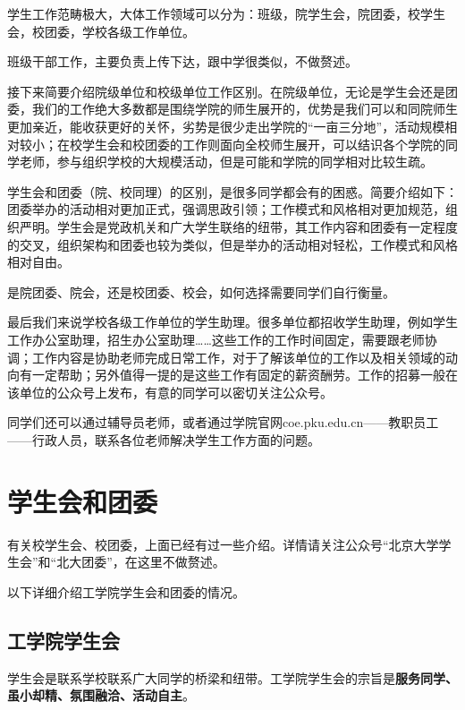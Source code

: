 \documentclass[11pt,oneside]{book}
\begin{document}
学生工作范畴极大，大体工作领域可以分为：班级，院学生会，院团委，校学生会，校团委，学校各级工作单位。

班级干部工作，主要负责上传下达，跟中学很类似，不做赘述。

接下来简要介绍院级单位和校级单位工作区别。在院级单位，无论是学生会还是团委，我们的工作绝大多数都是围绕学院的师生展开的，优势是我们可以和同院师生更加亲近，能收获更好的关怀，劣势是很少走出学院的“一亩三分地”，活动规模相对较小；在校学生会和校团委的工作则面向全校师生展开，可以结识各个学院的同学老师，参与组织学校的大规模活动，但是可能和学院的同学相对比较生疏。

学生会和团委（院、校同理）的区别，是很多同学都会有的困惑。简要介绍如下：团委举办的活动相对更加正式，强调思政引领；工作模式和风格相对更加规范，组织严明。学生会是党政机关和广大学生联络的纽带，其工作内容和团委有一定程度的交叉，组织架构和团委也较为类似，但是举办的活动相对轻松，工作模式和风格相对自由。

是院团委、院会，还是校团委、校会，如何选择需要同学们自行衡量。

最后我们来说学校各级工作单位的学生助理。很多单位都招收学生助理，例如学生工作办公室助理，招生办公室助理……这些工作的工作时间固定，需要跟老师协调；工作内容是协助老师完成日常工作，对于了解该单位的工作以及相关领域的动向有一定帮助；另外值得一提的是这些工作有固定的薪资酬劳。工作的招募一般在该单位的公众号上发布，有意的同学可以密切关注公众号。

同学们还可以通过辅导员老师，或者通过学院官网coe.pku.edu.cn——教职员工——行政人员，联系各位老师解决学生工作方面的问题。

\newpage

\section{学生会和团委}
有关校学生会、校团委，上面已经有过一些介绍。详情请关注公众号“北京大学学生会”和“北大团委”，在这里不做赘述。

以下详细介绍工学院学生会和团委的情况。


\subsection{工学院学生会}
学生会是联系学校联系广大同学的桥梁和纽带。工学院学生会的宗旨是\textbf{服务同学、虽小却精、氛围融洽、活动自主}。
\end{document}
